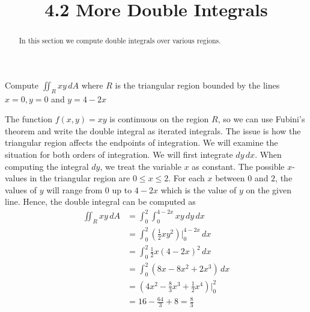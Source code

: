 \documentclass[handout]{ximera}
\title{4.2 More Double Integrals}
\begin{document}
\begin{abstract}
In this section we compute double integrals over various regions.
\end{abstract}
 
\maketitle




\begin{example}[Example 1]
Compute $\iint_R xy \, dA$ where $R$ is the triangular region bounded by the lines $x = 0, y = 0$ and $y = 4-2x$\\
\begin{image}
\end{image}

The function $f(x,y) = xy$ is continuous on the region $R$, so we can use Fubini's theorem and write the double integral as iterated integrals.
The issue is how the triangular region affects the endpoints of integration. We will examine the situation for both orders of integration.
We will first integrate $dy\, dx$. When computing the integral $dy$, we treat the variable $x$ as constant. 
The possible $x$-values in the triangular region are $0 \leq x \leq 2$.  
For each $x$ between $0$ and $2$, the values of $y$ will range from $0$ up to $4 - 2x$ which is the value of $y$ on the given line.
Hence, the double integral can be computed as
\begin{align*}
\iint_R xy \, dA & = \int_0^2 \int_0^{4 - 2x} xy \, dy \, dx\\
                 & = \int_0^2 \left(\frac12 xy^2 \right) \bigg|_{0}^{4 - 2x} \, dx\\
                 & = \int_0^2 \frac12 x (4-2x)^2 \, dx\\
                 &=  \int_0^2 \left(8x - 8x^2 + 2x^3\right) \, dx\\
                 &= \left(4x^2 - \frac83 x^3 + \frac12 x^4 \right) \bigg|_0^2\\
                 &= 16 - \frac{64}{3} + 8 = \frac83
\end{align*}      
\begin{image}
\end{image}



\end{example}
\end{document}
